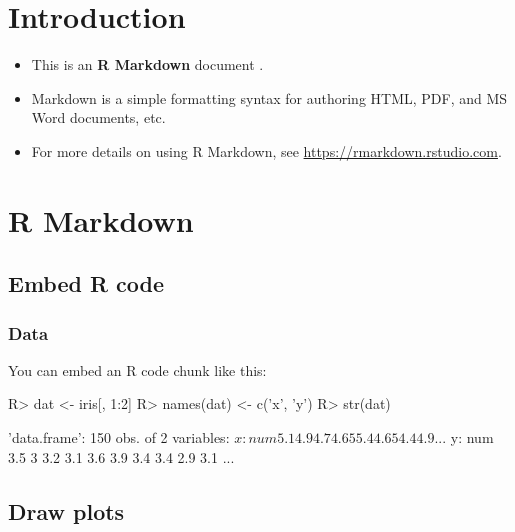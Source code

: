 \documentclass[
]{jss}
\author{
\\
}
\title{}
\providecommand{\tightlist}{%
  \setlength{\itemsep}{0pt}\setlength{\parskip}{0pt}}
\begin{document}
\hypertarget{introduction}{%
\section{Introduction}\label{introduction}}

\begin{itemize}
\tightlist
\item
  This is an \textbf{R Markdown} document \citep{R-rmarkdown}.
\item
  Markdown is a simple formatting syntax for authoring HTML, PDF, and MS
  Word documents, etc.
\item
  For more details on using R Markdown, see
  \url{https://rmarkdown.rstudio.com}.
\end{itemize}

\hypertarget{r-markdown}{%
\section{R Markdown}\label{r-markdown}}

\hypertarget{embed-r-code}{%
\subsection{Embed R code}\label{embed-r-code}}

\hypertarget{data}{%
\subsubsection{Data}\label{data}}

You can embed an R code chunk like this:

\begin{CodeChunk}

\begin{CodeInput}
R> dat <- iris[, 1:2]
R> names(dat) <- c('x', 'y')
R> str(dat)
\end{CodeInput}

\begin{CodeOutput}
'data.frame':   150 obs. of  2 variables:
 $ x: num  5.1 4.9 4.7 4.6 5 5.4 4.6 5 4.4 4.9 ...
 $ y: num  3.5 3 3.2 3.1 3.6 3.9 3.4 3.4 2.9 3.1 ...
\end{CodeOutput}
\end{CodeChunk}

\hypertarget{draw-plots}{%
\subsection{Draw plots}\label{draw-plots}}
\end{document}
